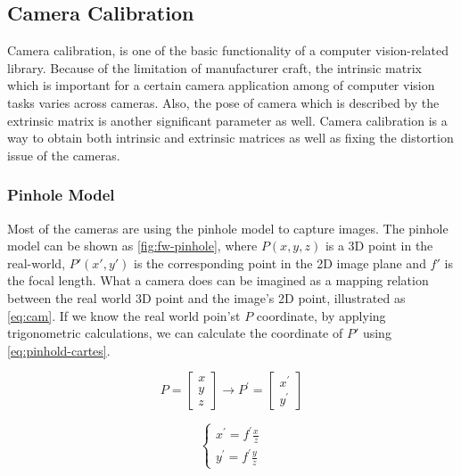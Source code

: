 \subsection{Camera Calibration}
\label{sec:Impl-fw-app-calib}

Camera calibration, is one of the basic functionality of a computer 
vision-related library. Because of the limitation of manufacturer craft, the 
intrinsic matrix which is important for a certain camera application among of computer vision 
tasks varies across cameras. 
Also, the pose of camera which is described by the extrinsic matrix is 
another significant parameter as well. 
Camera calibration is a way to obtain both intrinsic and extrinsic matrices as 
well as fixing the distortion issue of the cameras.

\subsubsection{Pinhole Model}

Most of the cameras are using the pinhole model to capture images. 
The pinhole model can be shown as \autoref{fig:fw-pinhole}, where $P(x, 
y, z)$ is a 3D point in the real-world, $P'(x', y')$ is the corresponding point in 
the 2D image plane and $f'$ is the focal length.
What a camera does can be imagined as a mapping relation between the real 
world 3D point and the image's 2D point, illustrated as \autoref{eq:cam}.
If we know the real world poin'st $P$ coordinate, by applying trigonometric 
calculations, we can calculate the coordinate of $P'$ using 
\autoref{eq:pinhold-cartes}.

\begin{equation}
\label{eq:cam}
P=\left[ \begin{array}{l}{x} \\ {y} \\ {z}\end{array}\right] \rightarrow
P^{\prime}=\left[ \begin{array}{l}{x^{\prime}} \\ {y^{\prime}}\end{array}\right]
\end{equation}

\begin{equation}
\label{eq:pinhold-cartes}
\left\{\begin{array}{l}{x^{\prime}=f^{\prime} \frac{x}{z}} \\
{y^{\prime}=f^{\prime} \frac{y}{z}}\end{array}\right.
\end{equation}


